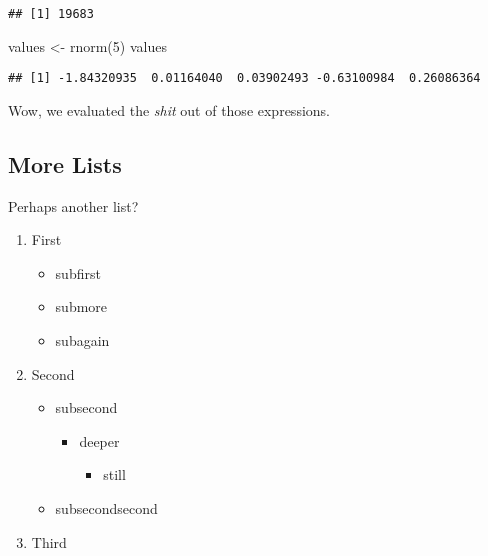 \documentclass[
]{article}
\newenvironment{Shaded}{\begin{snugshade}}{\end{snugshade}}
\newcommand{\DecValTok}[1]{\textcolor[rgb]{0.00,0.00,0.81}{#1}}
\newcommand{\FunctionTok}[1]{\textcolor[rgb]{0.00,0.00,0.00}{#1}}
\newcommand{\NormalTok}[1]{#1}
\newcommand{\OtherTok}[1]{\textcolor[rgb]{0.56,0.35,0.01}{#1}}
\providecommand{\tightlist}{%
  \setlength{\itemsep}{0pt}\setlength{\parskip}{0pt}}
\begin{document}
\begin{verbatim}
## [1] 19683
\end{verbatim}

\begin{Shaded}
\begin{Highlighting}[]
\NormalTok{values }\OtherTok{\textless{}{-}} \FunctionTok{rnorm}\NormalTok{(}\DecValTok{5}\NormalTok{)}
\NormalTok{values}
\end{Highlighting}
\end{Shaded}

\begin{verbatim}
## [1] -1.84320935  0.01164040  0.03902493 -0.63100984  0.26086364
\end{verbatim}

Wow, we evaluated the \emph{shit} out of those expressions.

\hypertarget{more-lists}{%
\subsection{More Lists}\label{more-lists}}

Perhaps another list?

\begin{enumerate}
\def\labelenumi{\arabic{enumi}.}
\tightlist
\item
  First

  \begin{itemize}
  \tightlist
  \item
    subfirst
  \item
    submore
  \item
    subagain
  \end{itemize}
\item
  Second

  \begin{itemize}
  \tightlist
  \item
    subsecond

    \begin{itemize}
    \tightlist
    \item
      deeper

      \begin{itemize}
      \tightlist
      \item
        still
      \end{itemize}
    \end{itemize}
  \item
    subsecondsecond
  \end{itemize}
\item
  Third
\end{enumerate}
\end{document}
